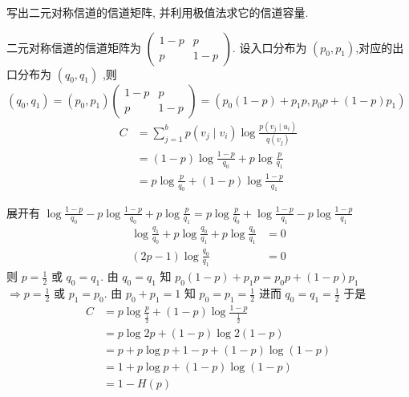\begin{tcolorbox}[breakable,colback=blue!5!white,colframe=blue!75!black,
 title= 解答题]

写出二元对称信道的信道矩阵, 并利用极值法求它的信道容量.
\tcblower

   二元对称信道的信道矩阵为 $ \left(\begin{array}{cc}1-p & p\\ p & 1-p\end{array}\right) $. 设入口分布为 $ \left(p_{0}, p_{1}\right) $,对应的出口分布为 $ \left(q_{0}, q_{1}\right) $ ,则 $ \left(q_{0}, q_{1}\right)=\left(p_{0}, p_{1}\right)\left(\begin{array}{cc}1-p & p \\ p & 1-p\end{array}\right)=\left(p_{0}(1-p)+p_{1}  p, p_{0} p+(1-p) p_{1}\right) $
$$
\begin{aligned}
C & =\sum_{j=1}^{b} p\left(v_{j} \mid v_{i}\right) \log \frac{p\left(v_{j} \mid u_{i}\right)}{q\left(v_{j}\right)} \\
& =(1-p) \log \frac{1-p}{q_{0}}+p \log \frac{p}{q_{1}} \\
& =p \log \frac{p}{q_{0}}+(1-p) \log \frac{1-p}{q_{1}}
\end{aligned}
$$

展开有 $ \log \frac{1-p}{q_{0}}-p \log \frac{1-p}{q_{0}}+p \log \frac{p}{q_{1}}=p \log \frac{p}{q_{0}}+\log \frac{1-p}{q_{1}}-p \log \frac{1-p}{q_{1}} $
$$
\begin{aligned}
\log \frac{q_{1}}{q_{0}}+p \log \frac{q_{0}}{q_{1}}+p \log \frac{q_{0}}{q_{1}} & =0 \\
(2 p-1) \log \frac{q_{0}}{q_{1}} & =0
\end{aligned}
$$
则 $ p=\frac{1}{2} $ 或 $ q_{0}=q_{1} $.
由 $ q_{0}=q_{1} $ 知 $p_{0}(1-p)+p_{1}p=p_{0} p+(1-p) p_{1}$ $\Rightarrow p=\frac{1}{2} \text { 或 } p_{1}=p_{0}$.
由 $ p_{0}+p_{1}=1 $ 知 $ p_{0}=p_{1}=\frac{1}{2} $ 进而 $ q_{0}=q_{1}=\frac{1}{2} $
于是
$$
\begin{aligned}
C & =p \log \frac{p}{\frac{1}{2}}+(1-p) \log \frac{1-p}{\frac{1}{2}} \\
& =p \log 2 p+(1-p) \log 2(1-p) \\
& =p+p \log p+1-p+(1-p) \log (1-p) \\
& =1+p \log p+(1-p) \log (1-p) \\
& =1-H(p)
\end{aligned}
$$
    
\end{tcolorbox}


